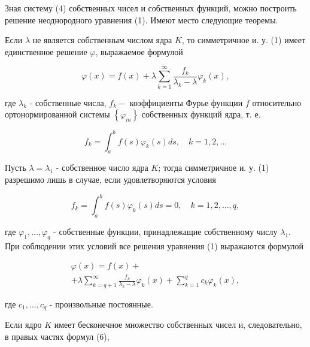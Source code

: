 \documentclass[10pt]{article}
\begin{document}
Зная систему (4) собственных чисел и собственных функций, можно построить решение неоднородного уравнения (1). Имеют место следующие теоремы.



Если $\lambda$ не является собственным числом ядра $K$, то симметричное и. у. (1) имеет единственное решение $\varphi$, выражаемое формулой



\[

\varphi(x)=f(x)+\lambda \sum_{k=1}^{\infty} \frac{f_{k}}{\lambda_{k}-\lambda} \varphi_{k}(x),

\]



где $\lambda_{k}$ - собственные числа, $f_{k}-$ коэффициенты Фурье функции $f$ относительно ортонормированной системы $\left\{\varphi_{m}\right\}$ собственных функций ядра, т. е.



\[

f_{k}=\int_{a}^{b} f(s) \varphi_{k}(s) d s, \quad k=1,2, \ldots

\]



Пусть $\lambda=\lambda_{1}$ - собственное число ядра $K$; тогда симметричное и. у. (1) разрешимо лишь в случае, если удовлетворяются условия



\[

f_{k}=\int_{a}^{b} f(s) \varphi_{k}(s) d s=0, \quad k=1,2, \ldots, q,

\]



где $\varphi_{1}, \ldots, \varphi_{q}$ - собственные функции, принадлежащие собственному числу $\lambda_{1}$. При соблюдении этих условий все решения уравнения (1) выражаются формулой



\[

\begin{gathered}

\varphi(x)=f(x)+ \\

+\lambda \sum_{k=q+1}^{\infty} \frac{f_{k}}{\lambda_{k}-\lambda} \varphi_{k}(x)+\sum_{k=1}^{q} c_{k} \varphi_{k}(x),

\end{gathered}

\]



где $c_{1}, \ldots, c_{q}$ - произвольные постоянные.



Если ядро $K$ имеет бесконечное множество собственных чисел и, следовательно, в правых частях формул (6),
\end{document}

